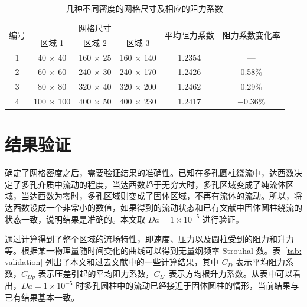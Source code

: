\begin{table}[ht]
	\caption{几种不同密度的网格尺寸及相应的阻力系数}\label{tab: grid}
	\vspace{.5em}\centering\wuhao
	\begin{tabular}{cccccc}
		\toprule[1.5pt]
		\multirow{2}[3]{*}{编号} & \multicolumn{3}{c}{网格尺寸} & \multirow{2}[3]{*}{平均阻力系数} & \multirow{2}[3]{*}{阻力系数变化率} \\
		\cmidrule[.67pt](lr){2-4}
		& 区域 1 & 区域 2 & 区域 3 & & \\
		\midrule[1pt]
		1 & 40 $\times$ 40 & 160 $\times$ 25 & 160 $\times$ 140 & 1.2354 & — \\
		2 & 60 $\times$ 60 & 240 $\times$ 30 & 240 $\times$ 170 & 1.2426 & 0.58\% \\
		3 & 80 $\times$ 80 & 320 $\times$ 40 & 320 $\times$ 200 & 1.2462 & 0.29\% \\
		4 & 100 $\times$ 100 & 400 $\times$ 50 & 400 $\times$ 230 & 1.2417 & $-0.36\%$ \\
		\bottomrule[1.5pt]
	\end{tabular}
\end{table}

\section{结果验证}\label{sec: result validation}

确定了网格密度之后，需要验证结果的准确性。已知在多孔圆柱绕流中，达西数决定了多孔介质中流动的程度，当达西数趋于无穷大时，多孔区域变成了纯流体区域，当达西数为零时，多孔区域则变成了固体区域，不再有流体的流动。所以，将达西数设成一个非常小的数值，如果得到的流动状态和已有文献中固体圆柱绕流的状态一致，说明结果是准确的。本文取 $Da=1\times 10^{-5}$ 进行验证。

通过计算得到了整个区域的流场特性，即速度、压力以及圆柱受到的阻力和升力等。根据某一物理量随时间变化的曲线可以得到无量纲频率 Strouhal 数。表~\ref{tab: validation} 列出了本文和过去文献中的一些计算结果，其中 $C_D$ 表示平均阻力系数，$C_{Dp}$ 表示压差引起的平均阻力系数，$C_{L'}$ 表示方均根升力系数。从表中可以看出，$Da=1\times 10^{-5}$ 时多孔圆柱中的流动已经接近于固体圆柱的情形，当前结果与已有结果基本一致。


